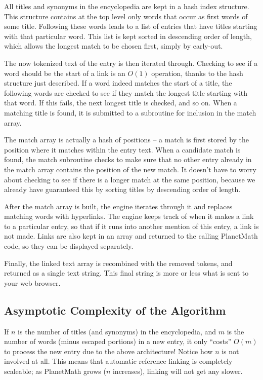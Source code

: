 All titles and synonyms in the encyclopedia are kept in a hash index structure. This structure contains at the top level only words that occur as first words of some title. Following these words leads to a list of entries that have titles starting with that particular word. This list is kept sorted in descending order of length, which allows the longest match to be chosen first, simply by early-out.

The now tokenized text of the entry is then iterated through. Checking to see if a word should be the start of a link is an $O(1)$ operation, thanks to the hash structure just described. If a word indeed matches the start of a title, the following words are checked to see if they match the longest title starting with that word. If this fails, the next longest title is checked, and so on. When a matching title is found, it is submitted to a subroutine for inclusion in the match array.

The match array is actually a hash of positions -- a match is first stored by the position where it matches within the entry text. When a candidate match is found, the match subroutine checks to make sure that no other entry already in the match array contains the position of the new match. It doesn't have to worry about checking to see if there is a longer match at the same position, because we already have guaranteed this by sorting titles by descending order of length.

After the match array is built, the engine iterates through it and replaces matching words with hyperlinks. The engine keeps track of when it makes a link to a particular entry, so that if it runs into another mention of this entry, a link is not made. Links are also kept in an array and returned to the calling PlanetMath code, so they can be displayed separately.

Finally, the linked text array is recombined with the removed tokens, and returned as a single text string. This final string is more or less what is sent to your web browser.

\subsection*{Asymptotic Complexity of the Algorithm}
If $n$ is the number of titles (and synonyms) in the encyclopedia, and $m$ is the number of words (minus escaped portions) in a new entry, it only ``costs'' $O(m)$ to process the new entry due to the above architecture! Notice how $n$ is not involved at all. This means that automatic reference linking is completely scaleable; as PlanetMath grows ($n$ increases), linking will not get any slower.

